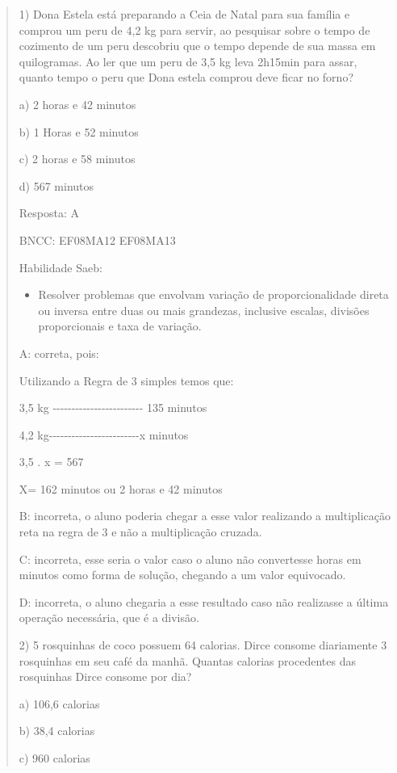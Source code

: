 \begin{quote}
\begin{escolha}
1) Dona Estela está preparando a Ceia de Natal para sua família e
comprou um peru de 4,2 kg para servir, ao pesquisar sobre o tempo de
cozimento de um peru descobriu que o tempo depende de sua massa em
quilogramas. Ao ler que um peru de 3,5 kg leva 2h15min para assar,
quanto tempo o peru que Dona estela comprou deve ficar no forno?

a) 2 horas e 42 minutos

b) 1 Horas e 52 minutos

c) 2 horas e 58 minutos

d) 567 minutos

Resposta: A

BNCC: EF08MA12 EF08MA13

Habilidade Saeb:

\begin{itemize}
\tightlist
\item
  Resolver problemas que envolvam variação de proporcionalidade direta
  ou inversa entre duas ou mais grandezas, inclusive escalas, divisões
  proporcionais e taxa de variação.
\end{itemize}

A: correta, pois:

Utilizando a Regra de 3 simples temos que:

3,5 kg
-\/-\/-\/-\/-\/-\/-\/-\/-\/-\/-\/-\/-\/-\/-\/-\/-\/-\/-\/-\/-\/-\/-\/-
135 minutos

4,2
kg-\/-\/-\/-\/-\/-\/-\/-\/-\/-\/-\/-\/-\/-\/-\/-\/-\/-\/-\/-\/-\/-\/-\/-x
minutos

3,5 . x = 567

X= 162 minutos ou 2 horas e 42 minutos

B: incorreta, o aluno poderia chegar a esse valor realizando a
multiplicação reta na regra de 3 e não a multiplicação cruzada.

C: incorreta, esse seria o valor caso o aluno não convertesse horas em
minutos como forma de solução, chegando a um valor equivocado.

D: incorreta, o aluno chegaria a esse resultado caso não realizasse a
última operação necessária, que é a divisão.

2) 5 rosquinhas de coco possuem 64 calorias. Dirce consome diariamente 3
rosquinhas em seu café da manhã. Quantas calorias procedentes das
rosquinhas Dirce consome por dia?

a) 106,6 calorias

b) 38,4 calorias

c) 960 calorias


\end{escolha}
\end{quote}
